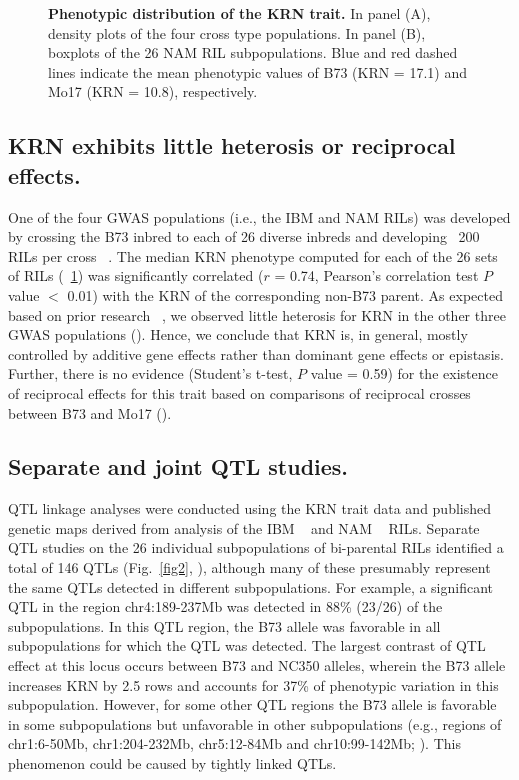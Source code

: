 \documentclass[10pt,letterpaper]{article}
\begin{document}
\begin{figure}[h]
\caption{{\bf Phenotypic distribution of the KRN trait.}
In panel (A), density plots of the four cross type populations. In panel (B), boxplots of the 26 NAM RIL subpopulations. Blue and red dashed lines indicate the mean phenotypic values of B73 (KRN = 17.1) and Mo17 (KRN = 10.8), respectively.}
\label{fig1}
\end{figure}

\subsection*{KRN exhibits little heterosis or reciprocal effects.}
One of the four GWAS populations (i.e., the IBM and NAM RILs) was developed by crossing the B73 inbred to each of 26 diverse inbreds and developing ~200 RILs per cross ~\cite{Lee2002, McMullen2009}. The median KRN phenotype computed for each of the 26 sets of RILs (~\ref{fig1}) was significantly correlated ($r$ = 0.74, Pearson’s correlation test $P$ value $<$ 0.01) with the KRN of the corresponding non-B73 parent. As expected based on prior research ~\cite{Srdic2007, Toledo2011}, we observed little heterosis for KRN in the other three GWAS populations (). Hence, we conclude that KRN is, in general, mostly controlled by additive gene effects rather than dominant gene effects or epistasis. Further, there is no evidence (Student’s t-test, $P$ value = 0.59) for the existence of reciprocal effects for this trait based on comparisons of reciprocal crosses between B73 and Mo17 ().

\subsection*{Separate and joint QTL studies.}

QTL linkage analyses were conducted using the KRN trait data and published genetic maps derived from analysis of the IBM ~\cite{Liu2010} and NAM ~\cite{Buckler2009} RILs. Separate QTL studies on the 26 individual subpopulations of bi-parental RILs identified a total of 146 QTLs (Fig.~\ref{fig2}, ), although many of these presumably represent the same QTLs detected in different subpopulations. For example, a significant QTL in the region chr4:189-237Mb was detected in 88\% (23/26) of the subpopulations. In this QTL region, the B73 allele was favorable in all subpopulations for which the QTL was detected. The largest contrast of QTL effect at this locus occurs between B73 and NC350 alleles, wherein the B73 allele increases KRN by 2.5 rows and accounts for 37\% of phenotypic variation in this subpopulation. However, for some other QTL regions the B73 allele is favorable in some subpopulations but unfavorable in other subpopulations (e.g., regions of chr1:6-50Mb, chr1:204-232Mb, chr5:12-84Mb and chr10:99-142Mb; ). This phenomenon could be caused by tightly linked QTLs.
\end{document}
